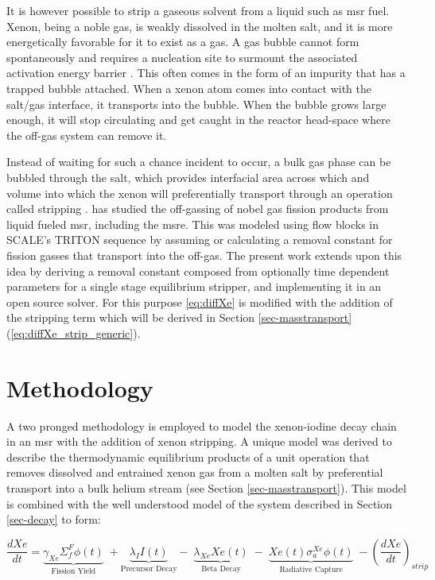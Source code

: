 It is however possible to strip a gaseous solvent from a liquid such as \acs{msr} fuel. Xenon, being a noble gas, is weakly dissolved in the molten salt, and it is more energetically favorable for it to exist as a gas. A gas bubble cannot form spontaneously and requires a nucleation site to surmount the associated activation energy barrier \cite{reviewXeMSR}. This often comes in the form of an impurity that has a trapped bubble attached. When a xenon atom comes into contact with the salt/gas interface, it transports into the bubble. When the bubble grows large enough, it will stop circulating and get caught in the reactor head-space where the off-gas system can remove it. 

Instead of waiting for such a chance incident to occur, a bulk gas phase can be bubbled through the salt, which provides interfacial area across which and volume into which the xenon will preferentially transport through an operation called stripping \cite[Ch. 10]{Geankoplis}. \cite{ORIGEN} has studied the off-gassing of nobel gas fission products from liquid fueled \acs{msr}, including the \acs{msre}. This was modeled using flow blocks in SCALE's TRITON sequence by assuming or calculating a removal constant for fission gasses that transport into the off-gas. The present work extends upon this idea by deriving a removal constant composed from optionally time dependent parameters for a single stage equilibrium stripper, and implementing it in an open source solver. For this purpose \ref{eq:diffXe} is modified with the addition of the stripping term which will be derived in Section \ref{sec-masstransport} (\ref{eq:diffXe_strip_generic}).

\section{Methodology}\label{sec-meth}
A two pronged methodology is employed to model the xenon-iodine decay chain in an \acs{msr} with the addition of xenon stripping. A unique model was derived to describe the thermodynamic equilibrium products of a unit operation that removes dissolved and entrained xenon gas from a molten salt by preferential transport into a bulk helium stream (see Section \ref{sec-masstransport}). This model is combined with the well understood model of the \Xe system described in Section \ref{sec-decay} to form: 

\begin{equation} \label{eq:diffXe_strip_generic}
    \frac{dXe}{dt} =
        \underbrace{\gamma_{Xe}\Sigma_{f}^{F}{\phi}(t)}_{\text{Fission Yield}}\;+\underbrace{\lambda_{I}I(t)}_{\text{Precursor Decay}}
        -\;\underbrace{\lambda_{Xe}Xe(t)}_{\text{Beta Decay}}
        \;-\;\underbrace{Xe(t)\sigma_{a}^{Xe}{\phi}(t)}_{\text{Radiative Capture}}
        \;-\left(\frac{dXe}{dt}\right)_{strip}
\end{equation}

